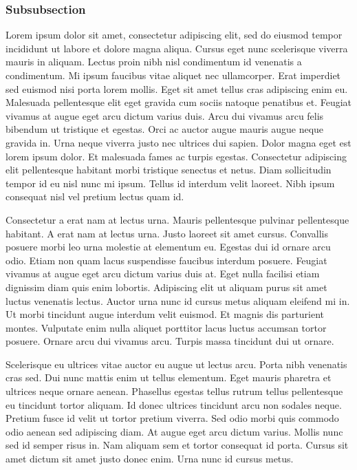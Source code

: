 \documentclass[red, openany, logo-1e]{shadowrun}
\begin{document}
\subsubsection{Subsubsection}
Lorem ipsum dolor sit amet, consectetur adipiscing elit, sed do eiusmod tempor incididunt ut labore et dolore magna aliqua. Cursus eget nunc scelerisque viverra mauris in aliquam. Lectus proin nibh nisl condimentum id venenatis a condimentum. Mi ipsum faucibus vitae aliquet nec ullamcorper. Erat imperdiet sed euismod nisi porta lorem mollis. Eget sit amet tellus cras adipiscing enim eu. Malesuada pellentesque elit eget gravida cum sociis natoque penatibus et. Feugiat vivamus at augue eget arcu dictum varius duis. Arcu dui vivamus arcu felis bibendum ut tristique et egestas. Orci ac auctor augue mauris augue neque gravida in. Urna neque viverra justo nec ultrices dui sapien. Dolor magna eget est lorem ipsum dolor. Et malesuada fames ac turpis egestas. Consectetur adipiscing elit pellentesque habitant morbi tristique senectus et netus. Diam sollicitudin tempor id eu nisl nunc mi ipsum. Tellus id interdum velit laoreet. Nibh ipsum consequat nisl vel pretium lectus quam id.

Consectetur a erat nam at lectus urna. Mauris pellentesque pulvinar pellentesque habitant. A erat nam at lectus urna. Justo laoreet sit amet cursus. Convallis posuere morbi leo urna molestie at elementum eu. Egestas dui id ornare arcu odio. Etiam non quam lacus suspendisse faucibus interdum posuere. Feugiat vivamus at augue eget arcu dictum varius duis at. Eget nulla facilisi etiam dignissim diam quis enim lobortis. Adipiscing elit ut aliquam purus sit amet luctus venenatis lectus. Auctor urna nunc id cursus metus aliquam eleifend mi in. Ut morbi tincidunt augue interdum velit euismod. Et magnis dis parturient montes. Vulputate enim nulla aliquet porttitor lacus luctus accumsan tortor posuere. Ornare arcu dui vivamus arcu. Turpis massa tincidunt dui ut ornare.

Scelerisque eu ultrices vitae auctor eu augue ut lectus arcu. Porta nibh venenatis cras sed. Dui nunc mattis enim ut tellus elementum. Eget mauris pharetra et ultrices neque ornare aenean. Phasellus egestas tellus rutrum tellus pellentesque eu tincidunt tortor aliquam. Id donec ultrices tincidunt arcu non sodales neque. Pretium fusce id velit ut tortor pretium viverra. Sed odio morbi quis commodo odio aenean sed adipiscing diam. At augue eget arcu dictum varius. Mollis nunc sed id semper risus in. Nam aliquam sem et tortor consequat id porta. Cursus sit amet dictum sit amet justo donec enim. Urna nunc id cursus metus.
\end{document}

